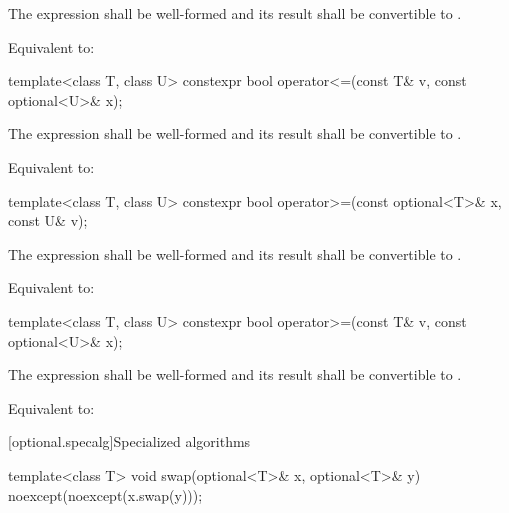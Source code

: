 \begin{itemdescr}
\pnum
\requires
The expression  shall be well-formed and
its result shall be convertible to .

\pnum
\effects
Equivalent to: 
\end{itemdescr}

%
\begin{itemdecl}
template<class T, class U> constexpr bool operator<=(const T& v, const optional<U>& x);
\end{itemdecl}

\begin{itemdescr}
\pnum
\requires
The expression  shall be well-formed and
its result shall be convertible to .

\pnum
\effects
Equivalent to: 
\end{itemdescr}

%
\begin{itemdecl}
template<class T, class U> constexpr bool operator>=(const optional<T>& x, const U& v);
\end{itemdecl}

\begin{itemdescr}
\pnum
\requires
The expression  shall be well-formed and
its result shall be convertible to .

\pnum
\effects
Equivalent to: 
\end{itemdescr}

%
\begin{itemdecl}
template<class T, class U> constexpr bool operator>=(const T& v, const optional<U>& x);
\end{itemdecl}

\begin{itemdescr}
\pnum
\requires
The expression  shall be well-formed and
its result shall be convertible to .

\pnum
\effects
Equivalent to: 
\end{itemdescr}


[optional.specalg]{Specialized algorithms}

%
\begin{itemdecl}
template<class T> void swap(optional<T>& x, optional<T>& y) noexcept(noexcept(x.swap(y)));
\end{itemdecl}

